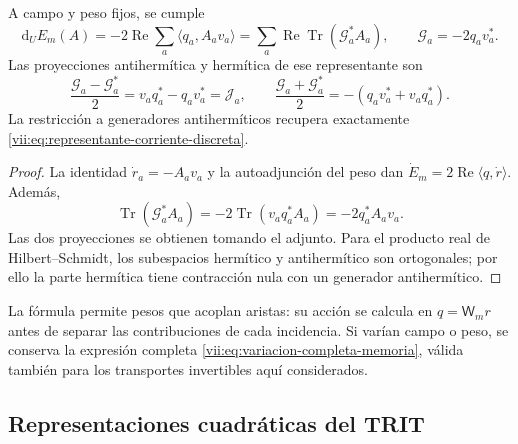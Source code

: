 \begin{proposition}
\label{vii:prop:diferencial-invertible}
A campo y peso fijos, se cumple
\begin{equation}
 \mathrm d_UE_m(A)=-2\operatorname{Re}\sum_a
       \langle q_a,A_av_a\rangle
 =\sum_a\operatorname{Re}\operatorname{Tr}(\mathcal G_a^*A_a),
 \qquad \mathcal G_a=-2q_av_a^*.
 \label{vii:eq:gradiente-transporte-completo}
\end{equation}
Las proyecciones antihermítica y hermítica de ese representante son
\begin{equation}
 \frac{\mathcal G_a-\mathcal G_a^*}{2}
   =v_aq_a^*-q_av_a^*=\mathcal J_a,
 \qquad
 \frac{\mathcal G_a+\mathcal G_a^*}{2}
   =-(q_av_a^*+v_aq_a^*).
 \label{vii:eq:proyecciones-gradiente-memoria}
\end{equation}
La restricción a generadores antihermíticos recupera exactamente
\eqref{vii:eq:representante-corriente-discreta}.
\end{proposition}

\begin{proof}
La identidad \(\dot r_a=-A_av_a\) y la autoadjunción del peso dan
\(\dot E_m=2\operatorname{Re}\langle q,\dot r\rangle\).
Además,
\[
 \operatorname{Tr}(\mathcal G_a^*A_a)
 =-2\operatorname{Tr}(v_aq_a^*A_a)=-2q_a^*A_av_a.
\]
Las dos proyecciones se obtienen tomando el adjunto. Para el producto
real de Hilbert--Schmidt, los subespacios hermítico y antihermítico son
ortogonales; por ello la parte hermítica tiene contracción nula con
un generador antihermítico.
\end{proof}

La fórmula permite pesos que acoplan aristas: su acción se calcula en
\(q=\mathsf W_mr\) antes de separar las contribuciones de cada
incidencia. Si varían campo o peso, se conserva la expresión completa
\eqref{vii:eq:variacion-completa-memoria}, válida también para los
transportes invertibles aquí considerados.

\subsection{Representaciones cuadráticas del TRIT}

